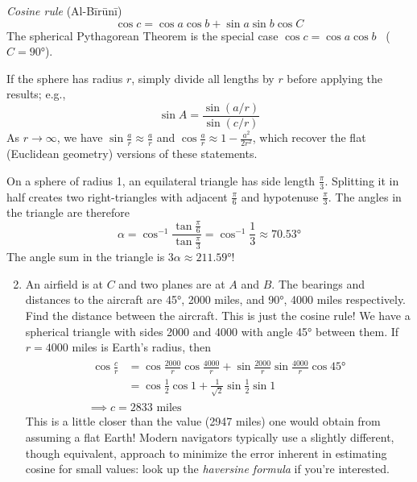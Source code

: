 \emph{Cosine rule} (Al-Bīrūnī)
\[
	\cos c=\cos a\cos b+\sin a\sin b\cos C
\]
The spherical Pythagorean Theorem is the special case $\cos c=\cos a\cos b$ \ ($C=\ang{90}$).\medbreak

If the sphere has radius $r$, simply divide all lengths by $r$ before applying the results; e.g.,
\[
	\sin A=\frac{\sin (a/r)}{\sin(c/r)}
\]
As $r\to\infty$, we have $\sin\frac ar\approx \frac ar$ and $\cos\frac ar\approx 1-\frac{a^2}{2r^2}$, which recover the flat (Euclidean geometry) versions of these statements.

\begin{examples*}{}{}
	\exstart On a sphere of radius 1, an equilateral triangle has side length $\frac\pi 3$. Splitting it in half creates two right-triangles with adjacent $\frac\pi 6$ and hypotenuse $\frac\pi 3$. The angles in the triangle are therefore
		\[
			\alpha=\cos^{-1}\frac{\tan\frac\pi 6}{\tan\frac\pi 3}=\cos^{-1}\frac 13\approx \ang{70.53}
		\]
		The angle sum in the triangle is $3\alpha\approx\ang{211.59}$!
		\begin{enumerate}\setcounter{enumi}{1}
			\item An airfield is at $C$ and two planes are at $A$ and $B$. The bearings and distances to the aircraft are \ang{45}, 2000 miles, and \ang{90}, 4000 miles respectively. Find the distance between the aircraft.\smallbreak
		This is just the cosine rule! We have a spherical triangle with sides 2000 and 4000 with angle \ang{45} between them. If $r=4000$ miles is Earth's radius, then
		\begin{gather*}
			\begin{aligned}
				\cos\frac cr &=\cos\frac{2000}r\cos\frac{4000}r+\sin\frac{2000}r\sin\frac{4000}r\cos\ang{45}\\
				&=\cos\frac 12\cos 1+\frac 1{\sqrt 2}\sin\frac 12\sin 1
			\end{aligned}\\
			\implies c=2833\text{ miles}
		\end{gather*}
		This is a little closer than the value (2947 miles) one would obtain from assuming a flat Earth!\smallbreak
		Modern navigators typically use a slightly different, though equivalent, approach to minimize the error inherent in estimating cosine for small values: look up the \emph{haversine formula} if you're interested.
	\end{enumerate}
\end{examples*}




